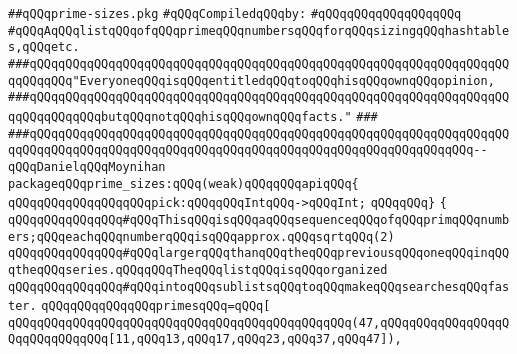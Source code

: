 \label{src/lib/src/prime-sizes.pkg}
\verb|##qQQqprime-sizes.pkg|\newline
\newline
\verb|#qQQqCompiledqQQqby:|\newline
\verb|#qQQqqQQqqQQqqQQqqQQq|\newline
\newline
\verb|#qQQqAqQQqlistqQQqofqQQqprimeqQQqnumbersqQQqforqQQqsizingqQQqhashtables,qQQqetc.|\newline
\newline
\newline
\newline
\verb|###qQQqqQQqqQQqqQQqqQQqqQQqqQQqqQQqqQQqqQQqqQQqqQQqqQQqqQQqqQQqqQQqqQQqqQQqqQQq"EveryoneqQQqisqQQqentitledqQQqtoqQQqhisqQQqownqQQqopinion,|\newline
\verb|###qQQqqQQqqQQqqQQqqQQqqQQqqQQqqQQqqQQqqQQqqQQqqQQqqQQqqQQqqQQqqQQqqQQqqQQqqQQqqQQqbutqQQqnotqQQqhisqQQqownqQQqfacts."|\newline
\verb|###|\newline
\verb|###qQQqqQQqqQQqqQQqqQQqqQQqqQQqqQQqqQQqqQQqqQQqqQQqqQQqqQQqqQQqqQQqqQQqqQQqqQQqqQQqqQQqqQQqqQQqqQQqqQQqqQQqqQQqqQQqqQQqqQQqqQQqqQQqqQQq--qQQqDanielqQQqMoynihan|\newline
\newline
\newline
\newline
\verb|packageqQQqprime_sizes:qQQq(weak)qQQqqQQqapiqQQq{|\newline
\newline
\verb|qQQqqQQqqQQqqQQqqQQqpick:qQQqqQQqIntqQQq->qQQqInt;|\newline
\newline
\verb|qQQqqQQq}|\newline
\verb|{|\newline
\verb|qQQqqQQqqQQqqQQq#qQQqThisqQQqisqQQqaqQQqsequenceqQQqofqQQqprimqQQqnumbers;qQQqeachqQQqnumberqQQqisqQQqapprox.qQQqsqrtqQQq(2)|\newline
\verb|qQQqqQQqqQQqqQQq#qQQqlargerqQQqthanqQQqtheqQQqpreviousqQQqoneqQQqinqQQqtheqQQqseries.qQQqqQQqTheqQQqlistqQQqisqQQqorganized|\newline
\verb|qQQqqQQqqQQqqQQq#qQQqintoqQQqsublistsqQQqtoqQQqmakeqQQqsearchesqQQqfaster.|\newline
\newline
\verb|qQQqqQQqqQQqqQQqprimesqQQq=qQQq[|\newline
\verb|qQQqqQQqqQQqqQQqqQQqqQQqqQQqqQQqqQQqqQQqqQQqqQQq(47,qQQqqQQqqQQqqQQqqQQqqQQqqQQqqQQq[11,qQQq13,qQQq17,qQQq23,qQQq37,qQQq47]),|\newline
